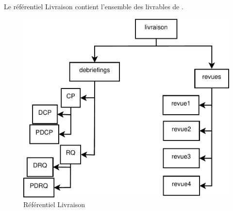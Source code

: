 
Le référentiel Livraison contient l'ensemble des livrables de \nomEquipe{}.

\clearpage

\begin{figure}[ht]
         \begin{center}
         \includegraphics[scale=0.5]{images/arboLivraison}
         \end{center}
         \caption{Référentiel Livraison}
 \end{figure}






